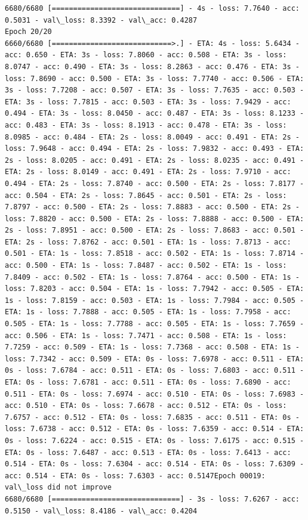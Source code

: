 \documentclass[11pt]{article}
\begin{document}
\begin{Verbatim}[commandchars=\\\{\}]
6680/6680 [==============================] - 4s - loss: 7.7640 - acc: 0.5031 - val\_loss: 8.3392 - val\_acc: 0.4287
Epoch 20/20
6660/6680 [============================>.] - ETA: 4s - loss: 5.6434 - acc: 0.650 - ETA: 3s - loss: 7.8060 - acc: 0.508 - ETA: 3s - loss: 8.0747 - acc: 0.490 - ETA: 3s - loss: 8.2863 - acc: 0.476 - ETA: 3s - loss: 7.8690 - acc: 0.500 - ETA: 3s - loss: 7.7740 - acc: 0.506 - ETA: 3s - loss: 7.7208 - acc: 0.507 - ETA: 3s - loss: 7.7635 - acc: 0.503 - ETA: 3s - loss: 7.7815 - acc: 0.503 - ETA: 3s - loss: 7.9429 - acc: 0.494 - ETA: 3s - loss: 8.0450 - acc: 0.487 - ETA: 3s - loss: 8.1233 - acc: 0.483 - ETA: 3s - loss: 8.1913 - acc: 0.478 - ETA: 3s - loss: 8.0985 - acc: 0.484 - ETA: 2s - loss: 8.0049 - acc: 0.491 - ETA: 2s - loss: 7.9648 - acc: 0.494 - ETA: 2s - loss: 7.9832 - acc: 0.493 - ETA: 2s - loss: 8.0205 - acc: 0.491 - ETA: 2s - loss: 8.0235 - acc: 0.491 - ETA: 2s - loss: 8.0149 - acc: 0.491 - ETA: 2s - loss: 7.9710 - acc: 0.494 - ETA: 2s - loss: 7.8740 - acc: 0.500 - ETA: 2s - loss: 7.8177 - acc: 0.504 - ETA: 2s - loss: 7.8645 - acc: 0.501 - ETA: 2s - loss: 7.8797 - acc: 0.500 - ETA: 2s - loss: 7.8883 - acc: 0.500 - ETA: 2s - loss: 7.8820 - acc: 0.500 - ETA: 2s - loss: 7.8888 - acc: 0.500 - ETA: 2s - loss: 7.8951 - acc: 0.500 - ETA: 2s - loss: 7.8683 - acc: 0.501 - ETA: 2s - loss: 7.8762 - acc: 0.501 - ETA: 1s - loss: 7.8713 - acc: 0.501 - ETA: 1s - loss: 7.8518 - acc: 0.502 - ETA: 1s - loss: 7.8714 - acc: 0.500 - ETA: 1s - loss: 7.8487 - acc: 0.502 - ETA: 1s - loss: 7.8409 - acc: 0.502 - ETA: 1s - loss: 7.8764 - acc: 0.500 - ETA: 1s - loss: 7.8203 - acc: 0.504 - ETA: 1s - loss: 7.7942 - acc: 0.505 - ETA: 1s - loss: 7.8159 - acc: 0.503 - ETA: 1s - loss: 7.7984 - acc: 0.505 - ETA: 1s - loss: 7.7888 - acc: 0.505 - ETA: 1s - loss: 7.7958 - acc: 0.505 - ETA: 1s - loss: 7.7788 - acc: 0.505 - ETA: 1s - loss: 7.7659 - acc: 0.506 - ETA: 1s - loss: 7.7471 - acc: 0.508 - ETA: 1s - loss: 7.7259 - acc: 0.509 - ETA: 1s - loss: 7.7368 - acc: 0.508 - ETA: 1s - loss: 7.7342 - acc: 0.509 - ETA: 0s - loss: 7.6978 - acc: 0.511 - ETA: 0s - loss: 7.6784 - acc: 0.511 - ETA: 0s - loss: 7.6803 - acc: 0.511 - ETA: 0s - loss: 7.6781 - acc: 0.511 - ETA: 0s - loss: 7.6890 - acc: 0.511 - ETA: 0s - loss: 7.6974 - acc: 0.510 - ETA: 0s - loss: 7.6983 - acc: 0.510 - ETA: 0s - loss: 7.6678 - acc: 0.512 - ETA: 0s - loss: 7.6757 - acc: 0.512 - ETA: 0s - loss: 7.6835 - acc: 0.511 - ETA: 0s - loss: 7.6738 - acc: 0.512 - ETA: 0s - loss: 7.6359 - acc: 0.514 - ETA: 0s - loss: 7.6224 - acc: 0.515 - ETA: 0s - loss: 7.6175 - acc: 0.515 - ETA: 0s - loss: 7.6487 - acc: 0.513 - ETA: 0s - loss: 7.6413 - acc: 0.514 - ETA: 0s - loss: 7.6304 - acc: 0.514 - ETA: 0s - loss: 7.6309 - acc: 0.514 - ETA: 0s - loss: 7.6303 - acc: 0.5147Epoch 00019: val\_loss did not improve
6680/6680 [==============================] - 3s - loss: 7.6267 - acc: 0.5150 - val\_loss: 8.4186 - val\_acc: 0.4204

    \end{Verbatim}
\end{document}
